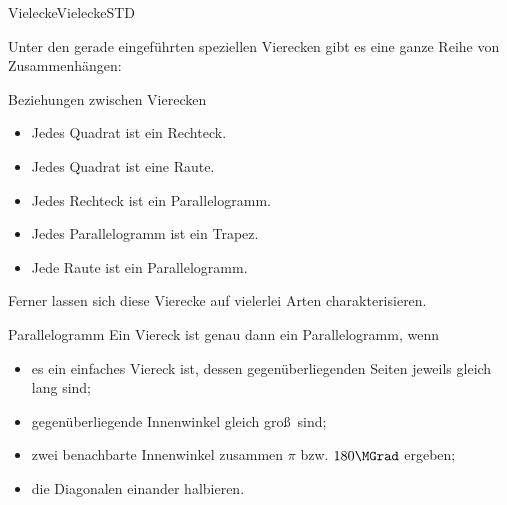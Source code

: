 \begin{MXContent}{Vielecke}{Vielecke}{STD}
\begin{center}
\end{center}


Unter den gerade eingef\"uhrten speziellen Vierecken gibt es eine ganze Reihe von Zusammenh\"angen:

\begin{MXInfo}{Beziehungen zwischen Vierecken}%
\begin{itemize}
 \item Jedes Quadrat ist ein Rechteck.
\item Jedes Quadrat ist eine Raute.
\item Jedes Rechteck ist ein Parallelogramm.
\item Jedes Parallelogramm ist ein Trapez.
\item Jede Raute ist ein Parallelogramm.
\end{itemize}
\end{MXInfo}

Ferner lassen sich diese Vierecke auf vielerlei Arten charakterisieren.

\begin{MXInfo}{Parallelogramm}%
Ein Viereck ist genau dann ein Parallelogramm, wenn
\begin{itemize}
 \item es ein einfaches Viereck ist, dessen gegen\"uberliegenden Seiten jeweils gleich lang sind;
\item gegen\"uberliegende Innenwinkel gleich gro\ss\ sind;
\item zwei benachbarte Innenwinkel zusammen $\pi$ bzw. $180\MGrad$ ergeben; 
\item die Diagonalen einander halbieren.
\end{itemize}
\end{MXInfo}



\end{MXContent}
